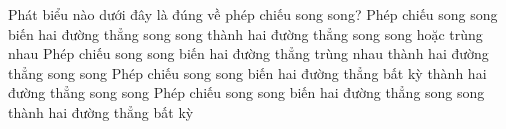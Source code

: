 \begin{ex}%
	Phát  biểu nào dưới đây là đúng về phép chiếu song song?
	 \choice
		{\True Phép chiếu  song song biến hai đường thẳng song song thành hai đường thẳng song song hoặc trùng nhau}
		{Phép chiếu song  song biến hai đường thẳng trùng nhau thành hai đường thẳng song song}
		{Phép chiếu song song biến hai đường thẳng bất kỳ thành hai  đường thẳng song song}
		{Phép chiếu  song song biến hai đường thẳng song song thành hai đường thẳng bất kỳ}
\end{ex}

